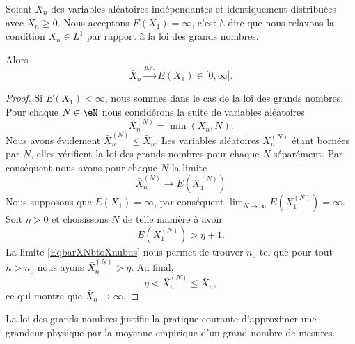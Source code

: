 \begin{proposition}
    Soient \( X_n\) des variables aléatoires indépendantes et identiquement distribuées avec \( X_n\geq 0\). Nous acceptons \( E(X_1)=\infty\), c'est à dire que nous relaxons la condition \( X_n\in L^1\) par rapport à la loi des grands nombres.

    Alors
    \begin{equation}
        \bar X_n\stackrel{p.s.}{\longrightarrow} E(X_1)\in\mathopen[ 0 , \infty \mathclose].
    \end{equation}
\end{proposition}

\begin{proof}
    Si \( E(X_1)<\infty\), nous sommes dans le cas de la loi des grands nombres. Pour chaque \( N\in\eN\) nous considérons la suite de variables aléatoires
    \begin{equation}
        X_n^{(N)}=\min(X_n,N).
    \end{equation}
    Nous avons évidement \( \bar X^{(N)}_n\leq \bar X_n\). Les variables aléatoires \( X^{(N)}_n\) étant bornées par \( N\), elles vérifient la loi des grands nombres pour chaque \( N\) séparément. Par conséquent nous avons pour chaque \( N\) la limite
    \begin{equation}        \label{EqbarXNbtoXnubus}
        \bar X^{(N)}_n\to E(X^{(N)}_1)
    \end{equation}
    Nous supposons que \( E(X_1)=\infty\), par conséquent  \( \lim_{N\to\infty}E(X_1^{(N)})=\infty\). Soit \( \eta>0\) et choisissons \( N\) de telle manière à avoir
    \begin{equation}
        E(X_1^{(N)})>\eta+1.
    \end{equation}
    La limite \eqref{EqbarXNbtoXnubus} nous permet de trouver \( n_0\) tel que pour tout \( n>n_0\) nous ayons \( \bar X^{(N)}_n>\eta\). Au final,
    \begin{equation}
        \eta<\bar X^{(N)}_n\leq \bar X_n,
    \end{equation}
    ce qui montre que \( \bar X_n\to\infty\).
\end{proof}

\begin{example}
    La loi des grands nombres justifie la pratique courante d'approximer une grandeur physique par la moyenne empirique d'un grand nombre de mesures.
\end{example}

